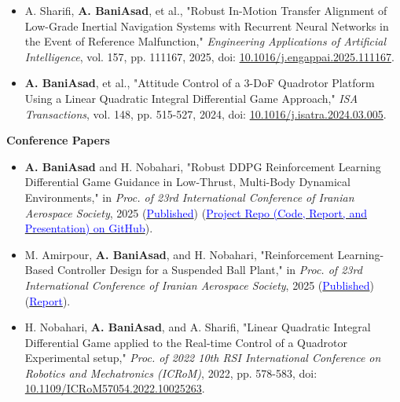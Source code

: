 \documentclass[12pt]{article}
\newcommand{\etal}{{et al.}}
\begin{document}
\begin{itemize} \itemsep -1pt %
	\item A. Sharifi, \textbf{A. BaniAsad}, et al., "Robust In-Motion Transfer Alignment of Low-Grade Inertial Navigation Systems with Recurrent Neural Networks in the Event of Reference Malfunction," \textit{Engineering Applications of Artificial Intelligence}, vol. 157, pp. 111167, 2025, doi: \href{https://doi.org/10.1016/j.engappai.2025.111167}{10.1016/j.engappai.2025.111167}.
	\item \textbf{A. BaniAsad}, et al., "Attitude Control of a 3-DoF Quadrotor Platform Using a Linear Quadratic Integral Differential Game Approach," \textit{ISA Transactions}, vol. 148, pp. 515-527, 2024, doi: \href{https://doi.org/10.1016/j.isatra.2024.03.005}{10.1016/j.isatra.2024.03.005}.
\end{itemize}

\noindent
{\bfseries Conference Papers}

\begin{itemize} \itemsep -1pt %
    \item \textbf{A. BaniAsad} and H. Nobahari, "Robust DDPG Reinforcement Learning Differential Game Guidance in Low-Thrust, Multi-Body Dynamical Environments," in \textit{Proc. of 23rd International Conference of Iranian Aerospace Society}, 2025 (\href{http://vcert.ir/users/qr.php?c=AERO2025-01540280}{\textcolor{blue}{Published}}) (\href{https://github.com/alibaniasad1999/DGDDPG}{\textcolor{blue}{Project Repo (Code, Report, and Presentation) on GitHub}}).
    \item M. Amirpour, \textbf{A. BaniAsad}, and H. Nobahari, "Reinforcement Learning-Based Controller Design for a Suspended Ball Plant," in \textit{Proc. of 23rd International Conference of Iranian Aerospace Society}, 2025 (\href{http://vcert.ir/users/qr.php?c=AERO2025-06200546}{\textcolor{blue}{Published}}) 
   (\href{https://drive.google.com/file/d/18oinC3TNsnMand_cw5BN_Z3qxRAvds8u/view?usp=sharing}{\textcolor{blue}{Report}}).
	\item H. Nobahari, \textbf{A. BaniAsad}, and A. Sharifi, "Linear Quadratic Integral Differential Game applied to the Real-time Control of a Quadrotor Experimental setup," \textit{Proc. of 2022 10th RSI International Conference on Robotics and Mechatronics (ICRoM)}, 2022, pp. 578-583, doi: \href{https://doi.org/10.1109/ICRoM57054.2022.10025263}{10.1109/ICRoM57054.2022.10025263}.
\end{itemize}
\end{document}
